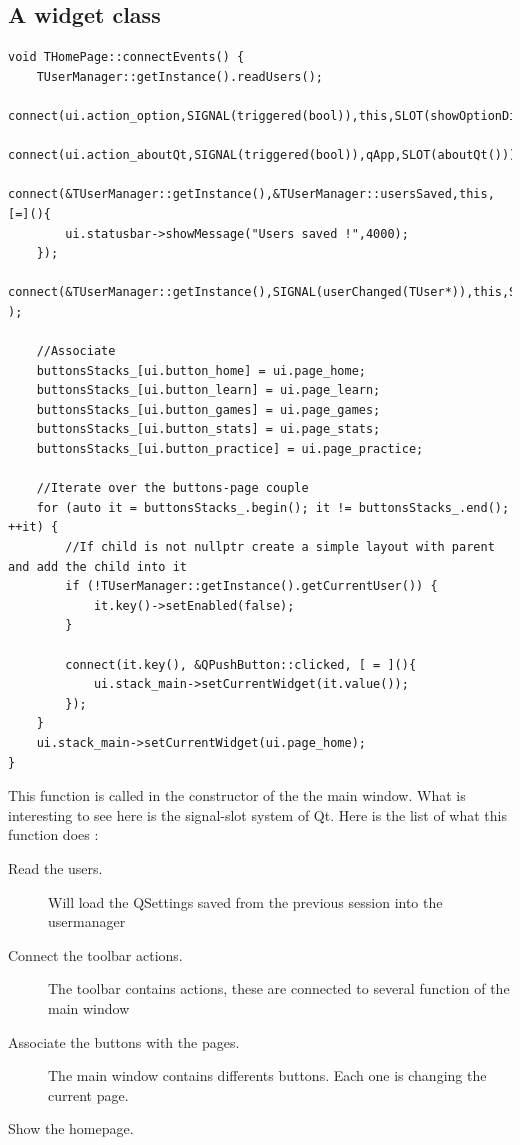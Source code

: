 \subsection{A widget class}
\begin{lstlisting}
void THomePage::connectEvents() {
    TUserManager::getInstance().readUsers();
    connect(ui.action_option,SIGNAL(triggered(bool)),this,SLOT(showOptionDialog()));
    connect(ui.action_aboutQt,SIGNAL(triggered(bool)),qApp,SLOT(aboutQt()));
    connect(&TUserManager::getInstance(),&TUserManager::usersSaved,this,[=](){
        ui.statusbar->showMessage("Users saved !",4000);
    });
    connect(&TUserManager::getInstance(),SIGNAL(userChanged(TUser*)),this,SLOT(updateUI(TUser*)) );

	//Associate 
    buttonsStacks_[ui.button_home] = ui.page_home;
    buttonsStacks_[ui.button_learn] = ui.page_learn;
    buttonsStacks_[ui.button_games] = ui.page_games;
    buttonsStacks_[ui.button_stats] = ui.page_stats;
    buttonsStacks_[ui.button_practice] = ui.page_practice;

    //Iterate over the buttons-page couple
    for (auto it = buttonsStacks_.begin(); it != buttonsStacks_.end(); ++it) {
        //If child is not nullptr create a simple layout with parent and add the child into it
        if (!TUserManager::getInstance().getCurrentUser()) {
            it.key()->setEnabled(false);
        }

        connect(it.key(), &QPushButton::clicked, [ = ](){
            ui.stack_main->setCurrentWidget(it.value());
        });
    }
    ui.stack_main->setCurrentWidget(ui.page_home);
}
\end{lstlisting}
This function is called in the constructor of the the main window. What is interesting to see here is the signal-slot system of Qt.
Here is the list of what this function does :
\begin{description}
	\item[Read the users.] Will load the QSettings saved from the previous session into the usermanager
	\item[Connect the toolbar actions.] The toolbar contains actions, these are connected to several function of the main window
	\item[Associate the buttons with the pages.] The main window contains differents buttons. Each one is changing the current page.
	\item[Show the homepage.]
\end{description}

